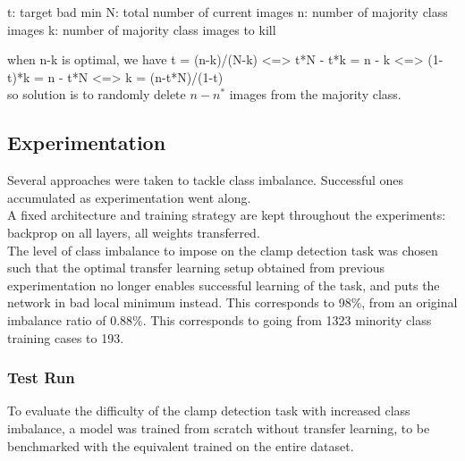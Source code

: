 \documentclass[a4paper,11pt]{article}
\begin{document}
t: target bad min
N: total number of current images
n: number of majority class images
k: number of majority class images to kill

when n-k is optimal, we have t = (n-k)/(N-k)
<=> t*N - t*k = n - k
<=> (1-t)*k = n - t*N
<=> k = (n-t*N)/(1-t) \\

so solution is to randomly delete $n - n^{*}$ images from the majority class. \\

\subsection{Experimentation}

Several approaches were taken to tackle class imbalance. Successful ones accumulated as experimentation went along. \\

A fixed architecture and training strategy are kept throughout the experiments: backprop on all layers, all weights transferred. \\

The level of class imbalance to impose on the clamp detection task was chosen such that the optimal transfer learning setup obtained from previous experimentation no longer enables successful learning of the task, and puts the network in bad local minimum instead. This corresponds to 98\%, from an original imbalance ratio of 0.88\%. This corresponds to going from 1323 minority class training cases to 193. \\

\subsubsection{Test Run}

To evaluate the difficulty of the clamp detection task with increased class imbalance, a model was trained from scratch without transfer learning, to be benchmarked with the equivalent trained on the entire dataset. 
\end{document}
